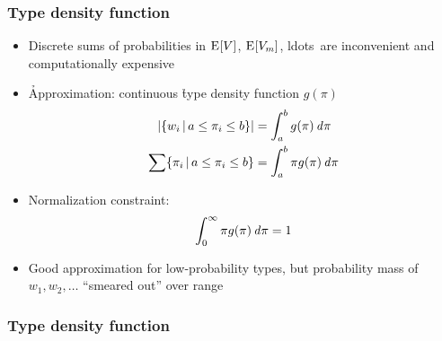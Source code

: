 \documentclass[handout,notes=show,t]{beamer} %
\begin{document}
\begin{frame}
  \frametitle{Type density function}

  \begin{itemize}
  \item Discrete sums of probabilities in $\mathrm{E}_{}[V]$, $\mathrm{E}_{}[V_m]$, ldots\ are inconvenient and computationally expensive
  \item \h{Approximation:} continuous \h{type density function} $g(\pi)$
    \begin{align*}
      \lvert \{w_i\,|\,a \leq \pi_i \leq b\}\rvert
      &= \int_a^b g(\pi) \,\mathit{d{\pi}}\\
      \sum \{\pi_i\,|\,a \leq \pi_i \leq b\}
      &= \int_a^b \pi g(\pi) \,\mathit{d{\pi}}
    \end{align*}
  \item<2-> Normalization constraint:
    \[
      \int_0^{\infty} \pi g(\pi) \,\mathit{d{\pi}} = 1
    \]
  \item<2-> Good approximation for low-probability types, but probability mass of $w_1, w_2, \ldots$ ``smeared out'' over range
  \end{itemize}
\end{frame}

\begin{frame}
  \frametitle{Type density function}

  \centering
\end{frame}
\end{document}
